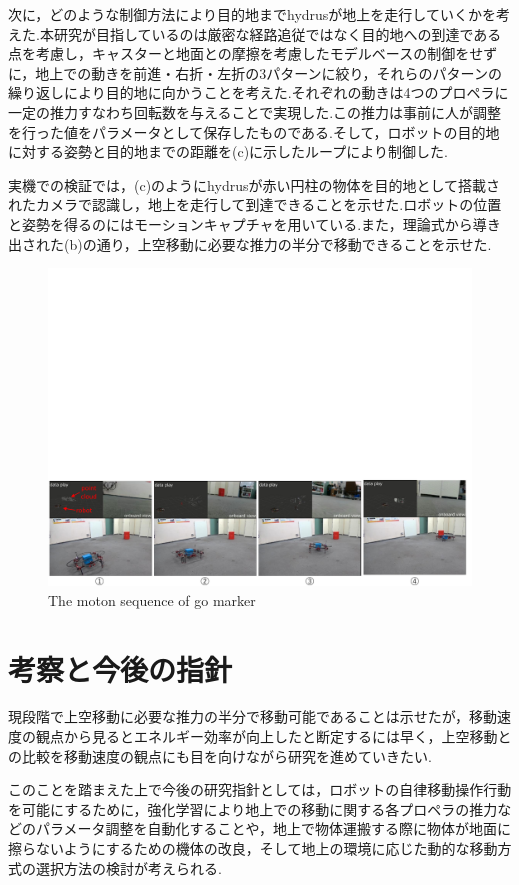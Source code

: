 \documentclass[twocolumn]{preport}
\begin{document}
次に，どのような制御方法により目的地までhydrusが地上を走行していくかを考えた.本研究が目指しているのは厳密な経路追従ではなく目的地への到達である点を考慮し，キャスターと地面との摩擦を考慮したモデルベースの制御をせずに，地上での動きを前進・右折・左折の3パターンに絞り，それらのパターンの繰り返しにより目的地に向かうことを考えた.それぞれの動きは4つのプロペラに一定の推力すなわち回転数を与えることで実現した.この推力は事前に人が調整を行った値をパラメータとして保存したものである.そして，ロボットの目的地に対する姿勢と目的地までの距離を(c)に示したループにより制御した.

実機での検証では，(c)のようにhydrusが赤い円柱の物体を目的地として搭載されたカメラで認識し，地上を走行して到達できることを示せた.ロボットの位置と姿勢を得るのにはモーションキャプチャを用いている.また，理論式から導き出された(b)の通り，上空移動に必要な推力の半分で移動できることを示せた.

\begin{figure}[ht]
  \begin{center}
    \includegraphics[clip,  bb= 0 0 711 180, width=1.0\columnwidth]{figs/go-marker.pdf}
  \end{center}
  \vspace{-5mm}
  \caption{The moton sequence of go marker}
      \vspace{-3mm}
  \label{figure:go_marker}
\end{figure}
\fi

\section{考察と今後の指針}
現段階で上空移動に必要な推力の半分で移動可能であることは示せたが，移動速度の観点から見るとエネルギー効率が向上したと断定するには早く，上空移動との比較を移動速度の観点にも目を向けながら研究を進めていきたい.

このことを踏まえた上で今後の研究指針としては，ロボットの自律移動操作行動を可能にするために，強化学習により地上での移動に関する各プロペラの推力などのパラメータ調整を自動化することや，地上で物体運搬する際に物体が地面に擦らないようにするための機体の改良，そして地上の環境に応じた動的な移動方式の選択方法の検討が考えられる.



\end{document}
